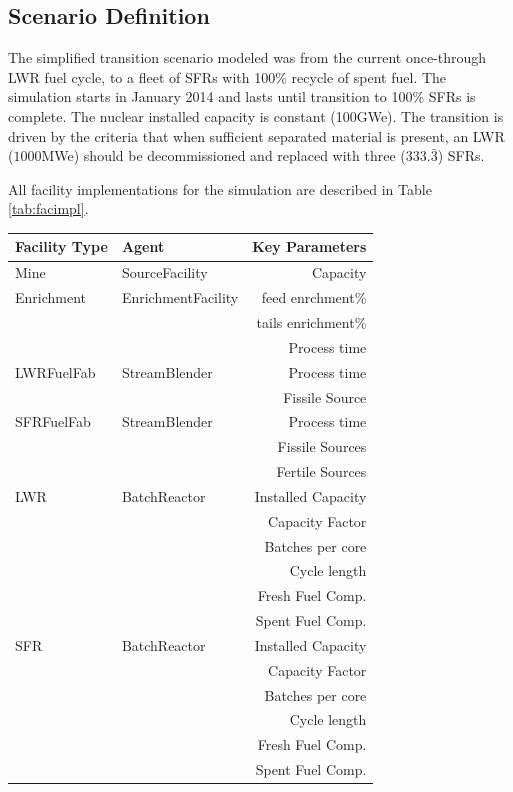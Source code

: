 \subsection{Scenario Definition}
The simplified transition scenario modeled was from the current once-through
\gls{LWR} fuel cycle, to a fleet of \glspl{SFR}
with 100\% recycle of spent fuel.  The simulation starts in January 2014 and
lasts until transition to 100\% \glspl{SFR} is complete. The nuclear installed
capacity is constant (100GWe).  The transition is driven by the criteria that 
when sufficient separated material is present, an LWR ($1000$MWe) should be 
decommissioned and replaced with three ($333.\bar{3}$) SFRs. 

All facility implementations for the simulation are described in Table 
\ref{tab:facimpl}.

\begin{table}
\centering
\begin{tabular}{|l|l|r|}
\hline
\textbf{Facility Type} &\textbf{Agent} & \textbf{Key Parameters}\\
\hline
Mine & SourceFacility & Capacity\\
\hline
Enrichment & EnrichmentFacility & feed enrchment\% \\
& & tails enrichment\% \\
& & Process time \\
\hline
LWRFuelFab & StreamBlender & Process time\\
& & Fissile Source\\
\hline
SFRFuelFab & StreamBlender  & Process time\\
& & Fissile Sources\\
& & Fertile Sources\\
\hline
LWR & BatchReactor & Installed Capacity \\
& & Capacity Factor \\
& & Batches per core \\ 
& & Cycle length\\
& & Fresh Fuel Comp. \\
& & Spent Fuel Comp. \\
\hline
SFR & BatchReactor & Installed Capacity\\
& & Capacity Factor \\
& & Batches per core \\ 
& & Cycle length\\
& & Fresh Fuel Comp. \\
& & Spent Fuel Comp. \\
\hline

\end{tabular}
\end{table}
